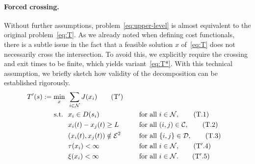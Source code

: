 \documentclass[a4paper]{report}
\theoremstyle{definition}
\theoremstyle{plain}
\begin{document}
\paragraph{Forced crossing.}
Without further assumptions, problem~\eqref{eq:upper-level} is almost equivalent to the original problem~\eqref{eq:T}.
%
As we already noted when defining cost functionals, there is a subtle issue in the fact
that a feasible solution $x$ of~\eqref{eq:T} does not necessarily cross the intersection.
%
To avoid this, we explicitly require the crossing and exit times to be finite,
which yields variant~\eqref{eq:T*}. With this technical assumption, we briefly
sketch how validity of the decomposition can be established rigorously.
\begin{alignat}{3}\label{eq:T*}
  T'(s) := \min_{x} \;\, & \sum_{i \in \mathcal{N}} J(x_{i}) \tag{$\mathrm{T}'$} \\
  \text{s.t. } \; & x_{i} \in D(s_{i}) && \quad \text{ for all } i \in \mathcal{N} , \tag{T.1} \\
           & x_{i}(t) - x_{j}(t) \geq L && \quad \text{ for all } (i,j) \in \mathcal{C} , \tag{T.2} \\
           & (x_{i}(t), x_{j}(t)) \notin \mathcal{E}^{2} && \quad\text{ for all } \{i, j\} \in \mathcal{D} , \tag{T.3} \label{eq:T*.3} \\
           & \tau(x_{i}) < \infty && \quad \text{ for all } i \in \mathcal{N} , \tag{$\mathrm{T}'.4$} \label{eq:T4*} \\
           & \xi(x_{i}) < \infty && \quad  \text{ for all } i \in \mathcal{N} . \tag{$\mathrm{T}'.5$} \label{eq:T5*}
\end{alignat}
\end{document}
